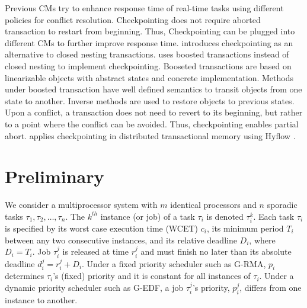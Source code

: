 \documentclass[conference]{IEEEtran}
\begin{document}
Previous CMs try to enhance response time of real-time tasks using different policies for conflict resolution. Checkpointing does not require aborted transaction to restart from beginning. Thus, Checkpointing can be plugged into different CMs to further improve response time. \cite{Koskinen:2008:CCI:1378533.1378563} introduces checkpointing as an alternative to closed nesting transactions\cite{turcu2012closed}. \cite{Koskinen:2008:CCI:1378533.1378563} uses boosted transactions \cite{Herlihy:2008:TBM:1345206.1345237} instead of closed nesting \cite{Peri:2011:CCE:1946143.1946152,turcu2012closed,6267834} to implement checkpointing. Booseted transactions are based on linearizable objects with abstract states and concrete implementation. Methods under boosted transaction have well defined semantics to transit objects from one state to another. Inverse methods are used to restore objects to previous states. Upon a conflict, a transaction does not need to revert to its beginning, but rather to a point where the conflict can be avoided. Thus, checkpointing enables partial abort. \cite{turcu_phd_proposal} applies checkpointing in distributed transactional memory using Hyflow \cite{Saad:2011:HHP:1996130.1996167}.
%
\section{Preliminary}

We consider a multiprocessor system with $m$ identical processors and $n$ sporadic tasks $\tau_1, \tau_2,\ldots, \tau_n$. The $k^{th}$ instance (or job) of a task $\tau_i$ is denoted $\tau_i^k$. Each task $\tau_i$ is specified by its worst case execution time (WCET) $c_i$, its minimum period $T_i$ between any two consecutive instances, and its relative deadline $D_i$, where $D_i=T_i$. Job $\tau_i^j$ is released at time $r_i^j$ and must finish no later than its absolute deadline $d_i^j=r_i^j+D_i$. Under a fixed priority scheduler such as G-RMA, $p_i$ determines $\tau_i$'s (fixed) priority and it is constant for all instances of $\tau_i$. Under a dynamic priority scheduler such as G-EDF, a job $\tau_i^j$'s priority, $p_i^j$, differs from one instance to another. 
\end{document}
